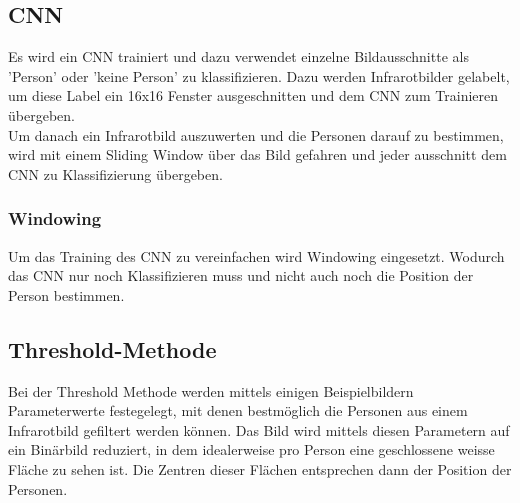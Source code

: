 \subsection{CNN}

Es wird ein \gls{CNN} trainiert und dazu verwendet einzelne Bildausschnitte als 'Person' oder 'keine Person' zu klassifizieren. Dazu werden Infrarotbilder gelabelt, um diese Label ein 16x16 Fenster ausgeschnitten und dem \gls{CNN} zum Trainieren übergeben.\\
Um danach ein Infrarotbild auszuwerten und die Personen darauf zu bestimmen, wird mit einem Sliding Window über das Bild gefahren und jeder ausschnitt dem \gls{CNN} zu Klassifizierung übergeben.

\subsubsection{Windowing}
Um das Training des \gls{CNN} zu vereinfachen wird Windowing eingesetzt. Wodurch das \gls{CNN} nur noch Klassifizieren muss und nicht auch noch die Position der Person bestimmen.

\subsection{Threshold-Methode}

Bei der Threshold Methode werden mittels einigen Beispielbildern Parameterwerte festegelegt, mit denen bestmöglich die Personen aus einem Infrarotbild gefiltert werden können. Das Bild wird mittels diesen Parametern auf ein Binärbild reduziert, in dem idealerweise pro Person eine geschlossene weisse Fläche zu sehen ist. Die Zentren dieser Flächen entsprechen dann der Position der Personen.